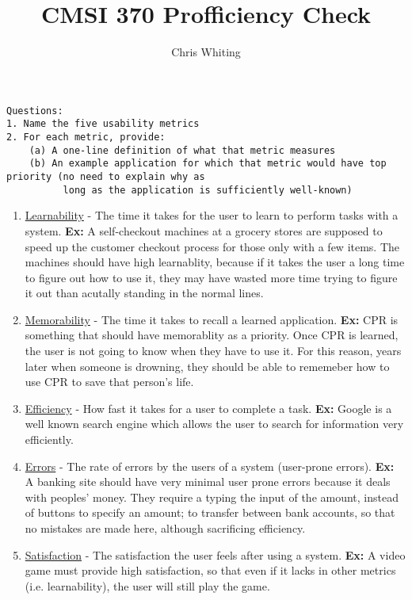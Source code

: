 \documentclass[11pt]{article}
\title{CMSI 370 Profficiency Check}
\author{Chris Whiting}
\begin{document}
\maketitle

 
\begin{verbatim}
Questions:
1. Name the five usability metrics
2. For each metric, provide:
	(a) A one-line definition of what that metric measures
	(b) An example application for which that metric would have top priority (no need to explain why as 
	      long as the application is sufficiently well-known)
\end{verbatim}

\begin{enumerate}
\item \underline{Learnability} - The time it takes for the user to learn to perform tasks with a system.
\textbf{Ex:} A self-checkout machines at a grocery stores are supposed to speed up the customer checkout process for those only with a few items. The machines should have high learnablity, because if it takes the user a long time to figure out how to use it, they may have wasted more time trying to figure it out than acutally standing in the normal lines. 
\item\underline{Memorability} - The time it takes to recall a learned application. 
\textbf{Ex:} CPR is something that should have memorablity as a priority. Once CPR is learned, the user is not going to know when they have to use it. For this reason, years later when someone is drowning, they should be able to rememeber how to use CPR to save that person's life.
\item \underline{Efficiency} - How fast it takes for a user to complete a task.
\textbf{Ex:} Google is a well known search engine which allows the user to search for information very efficiently.
\item \underline{Errors} - The rate of errors by the users of a system (user-prone errors).
\textbf{Ex: } A banking site should have very minimal user prone errors because it deals with peoples' money. They require a typing the input of the amount, instead of buttons to specify an amount; to transfer between bank accounts, so that no mistakes are made here, although sacrificing efficiency.
\item\underline{Satisfaction} - The satisfaction the user feels after using a system.
\textbf{Ex:} A video game must provide high satisfaction, so that even if it lacks in other metrics (i.e. learnability), the user will still play the game.
\end{enumerate}
\end{document}
